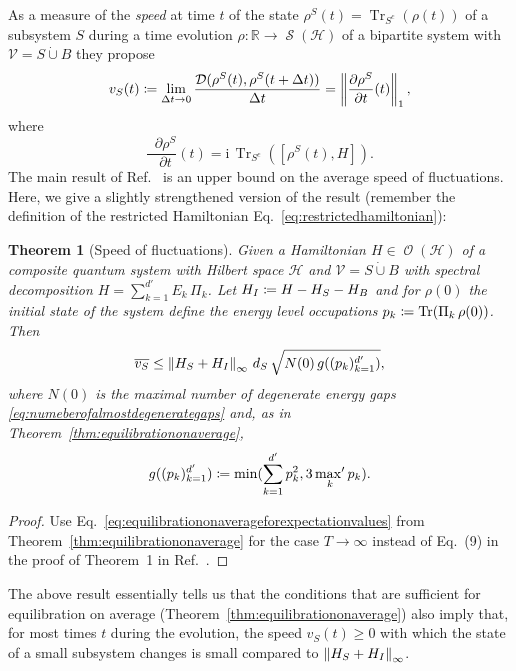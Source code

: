 \documentclass[a4paper,12pt,listof=totoc,index=totoc,bibliography=totoc,headsepline=false,headings=normal,BCOR16.153846mm,DIV12,headinclude,twoside,cleardoublepage=empty,numbers=noenddot,final]{scrreprt}
\theoremstyle{mystyle}
\numberwithin{equation}{section}
\numberwithin{figure}{section}
\numberwithin{lemma}{section}
\newtheorem{theorem}{Theorem}
\numberwithin{theorem}{section}
\numberwithin{corollary}{section}
\numberwithin{definition}{section}
\numberwithin{conjecture}{section}
\numberwithin{observation}{section}
\newcommand{\+}{\mkern2mu}
\newcommand{\coloneqq}{\mathrel{\vcentcolon\mkern-1.2mu=}} %
\newcommand{\dunion}{\mathbin{\dot{\cup}}}
\newcommand{\texteqref}[1]{Eq.~\eqref{#1}}
\renewcommand{\min}{\mathchoice{\operatorname*{min}}{\operatorname*{min}}{\mathrm{min}}{\mathrm{min}}}
\renewcommand{\H}{H}
\newcommand{\Vset}{\mathcal{V}}
\newcommand{\norm}[2][]{
  \ifthenelse{\equal{#1}{}}
    {\left\| {#2} \right\|}
    {\ifthenelse{\equal{#1}{uinv}}
      {\left\vert\kern-0.25ex\left\vert\kern-0.25ex\left\vert {#2} \right\vert\kern-0.25ex\right\vert\kern-0.25ex\right\vert}
      {\left\| {#2} \right\|_{#1}}
    }
}
\newcommand{\taverage}[2][]{
  \ifthenelse{\equal{#1}{}}
  {\overline{#2}}
  {\overline{#2}^{#1}}
}
\newcommand{\tracedistance}[3][]{
  \ifthenelse{\equal{#2}{}}
  {\ifthenelse{\equal{#3}{}}
    {\mathcal{D}_{#1}}{}
  }{
    \ifthenelse{\equal{#1}{}}
    {\operatorname{\mathcal{D}}(#2,#3)}
    {\operatorname{\mathcal{D}}_{#1}(#2,#3)}
  }
}
\DeclareMathOperator*{\maxprime}{\mathrm{max}^\prime}
\newcommand{\del}{\mathop{}\!\partial}
\newcommand{\compl}[1]{{{#1}^c}}
\renewcommand{\i}{\mathrm{i}}
\DeclareMathOperator{\1}{\mathds{1}}
\DeclareMathOperator{\Obs}{\mathcal{O}}
\DeclareMathOperator{\Qst}{\mathcal{S}}
\DeclareMathOperator{\Tr}{Tr}
\newcommand{\mc}[1]{\mathcal{#1}}
\newcommand{\mcH}{\mc{H}}
\newcommand{\mb}[1]{\mathbb{#1}}
\newcommand{\R}{\mb{R}}
\begin{document}
As a measure of the \emph{speed} at time $t$ of the state $\rho^S(t) = \Tr_{\compl{S}}(\rho(t))$ of a subsystem $S$ during a time evolution $\rho \colon \R \to \Qst(\mcH)$ of a bipartite system with $\Vset = S \dunion B$ they propose
\begin{equation}
  v_S(t) \coloneqq \lim_{\Delta t \to 0} \frac{\tracedistance{\rho^S(t)}{\rho^S(t+\Delta t)}}{\Delta t} = \norm[1]{\frac{\del \rho^S}{\del t}(t)} ,
\end{equation}
where
\begin{equation}
  \frac{\del \rho^S}{\del t}(t) = \i\, \Tr_{\compl{S}}([\rho^S(t),\H]) .
\end{equation}
The main result of Ref.~\cite{Linden10} is an upper bound on the average speed of fluctuations.
Here, we give a slightly strengthened version of the result (remember the definition of the restricted Hamiltonian \texteqref{eq:restrictedhamiltonian}):
\begin{theorem}[Speed of fluctuations] \label{thm:speedoffluctuations}
  Given a Hamiltonian $\H \in \Obs(\mcH)$ of a composite quantum system with Hilbert space $\mcH$ and $\Vset = S \dunion B$ with spectral decomposition $\H = \sum_{k=1}^{d'} E_k\,\Pi_k$.
  Let $\H_I \coloneqq \H - \H_S - \H_B$ and for $\rho(0)$ the initial state of the system define the energy level occupations $p_k \coloneqq \Tr(\Pi_k\,\rho(0))$.
  Then
  \begin{equation}
    \taverage{v_S} \leq \norm[\infty]{\H_S+\H_I}\,d_S\,\sqrt{N(0)\,g((p_k)_{k=1}^{d'})} ,
  \end{equation}
  where $N(0)$ is the maximal number of degenerate energy gaps \eqref{eq:numeberofalmostdegenerategaps} and, as in Theorem~\ref{thm:equilibrationonaverage},
  \begin{equation}
    g((p_k)_{k=1}^{d'}) \coloneqq \min(\sum_{k=1}^{d'} p_k^2, 3  \maxprime_k p_k ) .
  \end{equation}
\end{theorem}
\begin{proof}
  Use \texteqref{eq:equilibrationonaverageforexpectationvalues} from Theorem~\ref{thm:equilibrationonaverage} for the case $T\to\infty$ instead of Eq.~(9) in the proof of Theorem~1 in Ref.~\cite{Linden10}.
\end{proof}

The above result essentially tells us that the conditions that are sufficient for equilibration on average (Theorem~\ref{thm:equilibrationonaverage}) also imply that, for most times $t$ during the evolution, the speed $v_S(t) \geq 0$ with which the state of a small subsystem changes is small compared to $\norm[\infty]{\H_S+\H_I}$.
\end{document}
